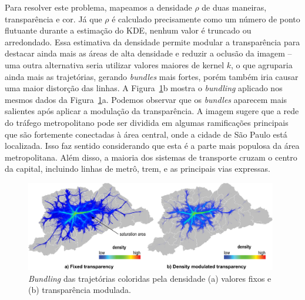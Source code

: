 Para resolver este problema, mapeamos a densidade $\rho$ de duas maneiras,
transparência e cor. Já que $\rho$ é calculado precisamente como um número
de ponto flutuante durante a estimação do KDE, nenhum valor é truncado ou arredondado.
Essa estimativa da densidade permite modular a transparência para destacar ainda
mais as áreas de alta densidade e reduzir a oclusão da imagem -- uma outra alternativa
seria utilizar valores maiores de kernel $k$, o que agruparia ainda mais as trajetórias, gerando
\emph{bundles} mais fortes, porém também iria causar uma maior distorção das linhas.
A Figura~\ref{fig:bundled-graph-density}b mostra o \emph{bundling} aplicado nos mesmos
dados da Figura~\ref{fig:bundled-graph-density}a. Podemos observar que os \emph{bundles}
aparecem mais salientes após aplicar a modulação da transparência. A imagem sugere que a rede do tráfego metropolitano
pode ser dividida em algumas ramificações principais que são fortemente conectadas à área central,
onde a cidade de São Paulo está localizada. Isso faz sentido considerando que esta é a parte
mais populosa da área metropolitana. Além disso, a maioria dos sistemas de transporte
cruzam o centro da capital, incluindo linhas de metrô, trem, e as principais vias expressas.

\begin{figure}[!htb]
  \centering
  \captionsetup{justification=centering}
  \includegraphics[width=0.98\textwidth]{../figuras/figure1}
  \caption{\emph{Bundling} das trajetórias coloridas pela densidade (a) valores fixos e \\(b) transparência modulada.}
  \label{fig:bundled-graph-density}  
\end{figure}

